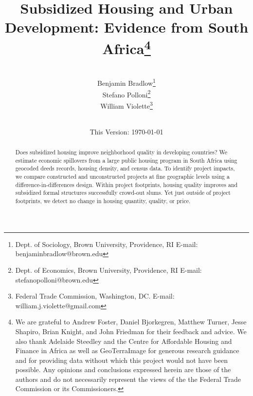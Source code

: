 \documentclass[12pt]{article}
\begin{document}
\begin{titlepage} 
\title{{Subsidized Housing and Urban Development: Evidence from South Africa}\thanks{We are grateful to Andrew Foster, Daniel Bjorkegren, Matthew Turner, Jesse Shapiro, Brian Knight, and John Friedman for their feedback and advice.  We also thank Adelaide Steedley and the Centre for Affordable Housing and Finance in Africa as well as GeoTerraImage for generous research guidance and for providing data without which this project would not have been possible.  Any opinions and conclusions expressed herein are those of the authors and do not necessarily represent the views of the the Federal Trade Commission or its Commissioners.}}
\author{\\[3em] Benjamin Bradlow\thanks{Dept. of Sociology, Brown University, Providence, RI  E-mail: benjamin\textunderscore bradlow@brown.edu}\\
 Stefano Polloni\thanks{Dept. of Economics, Brown University, Providence, RI E-mail: stefano\textunderscore polloni@brown.edu}\\ 
  William Violette\thanks{Federal Trade Commission, Washington, DC. E-mail: william.j.violette@gmail.com} \\
 \\ 
  }
\vspace{30mm}
\date{\vspace{5mm}This Version: \today}
\maketitle
\begin{abstract}

	Does subsidized housing improve neighborhood quality in developing countries? We estimate economic spillovers from a large public housing program in South Africa using geocoded deeds records, housing density, and census data.  To identify project impacts, we compare constructed and unconstructed projects at fine geographic levels using a difference-in-differences design.  Within project footprints, housing quality improves and subsidized formal structures successfully crowd-out slums. Yet just outside of project footprints, we detect no change in housing quantity, quality, or price. 

\bigskip
\end{abstract}
\setcounter{page}{0}
\thispagestyle{empty}
\end{titlepage}
\pagebreak \newpage
\end{document}
